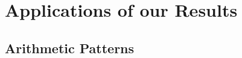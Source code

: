 \documentclass[dvipsnames,letterpaper,12pt]{article}
\numberwithin{equation}{section}
\newtheorem{remark}[theorem]{Remark}
\numberwithin{theorem}{section}
\DeclareMathOperator{\EE}{\mathbb{E}}
\newcommand{\psitwo}[1]{\| {#1} \|_{\psi_2(L)}}
\begin{document}
\begin{itemize}
\begin{comment}
        \item If $|X| \leq A$ almost surely, then $\psitwo{X} \leq 10 A$. Thus bounded random variables are subgaussian.



        \item If $X_1, \dots, X_N$ are \emph{independent}, then
        \[ \psitwo{X_1 + \dots + X_N} \leq 10 \left( \psitwo{X_1}^2 + \dots + \psitwo{X_N}^2 \right)^{1/2}. \]
        This is an equivalent way to state \emph{Hoeffding's Inequality}, and we refer to an application of this inequality as an application of Hoeffding's inequality.
    \end{itemize}
    Roughly speaking, if $X$ is a random variable with $\psitwo{X} \leq A$, we can think of $X$ as being sharply concentrated in the region $[-A,A]$. The Orlicz norm thus provides a convenient way to quantify concentration phenomena.
    \begin{remark}
        The constants involved in these statements are suboptimal, but will suffice for our purposes. Proofs can be found in Chapter 2 of \cite{Vershynin}.
    \end{remark}

    \end{comment}

\end{itemize}




\section{Applications of our Results} \label{ApplicationsSection}

\subsection{Arithmetic Patterns}
\end{document}
